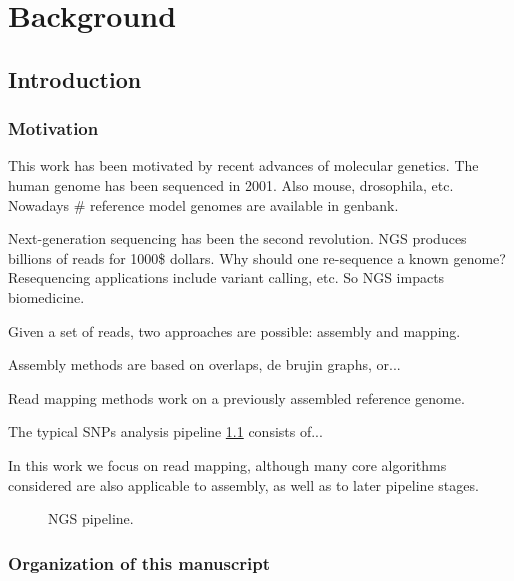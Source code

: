 \chapter{Background}


\section{Introduction}


\subsection{Motivation}

This work has been motivated by recent advances of molecular genetics.
The human genome has been sequenced in 2001. Also mouse, drosophila, etc.
Nowadays \# reference model genomes are available in genbank.

Next-generation sequencing has been the second revolution.
NGS produces billions of reads for 1000\$ dollars.
Why should one re-sequence a known genome?
Resequencing applications include variant calling, etc.
So NGS impacts biomedicine.

Given a set of reads, two approaches are possible: assembly and mapping.

Assembly methods are based on overlaps, de brujin graphs, or...

Read mapping methods work on a previously assembled reference genome.

The typical SNPs analysis pipeline \ref{fig:ngs-pipeline} consists of...

In this work we focus on read mapping, although many core algorithms considered are also applicable to assembly, as well as to later pipeline stages.

\begin{figure}[h]
\caption{NGS pipeline.}
\label{fig:ngs-pipeline}
\end{figure}

\subsection{Organization of this manuscript}


